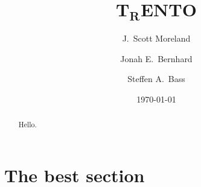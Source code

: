 \documentclass[aps,prl,reprint,amsmath]{revtex4-1}
\begin{document}
\title{T$_{\mathbf R}$ENTO}

\author{J.\ Scott Moreland}
\author{Jonah E.\ Bernhard}
\author{Steffen A.\ Bass}

\date{\today}


\begin{abstract}
  Hello.
\end{abstract}


\maketitle


\section{The best section}


\cite{constraining-ic}



\end{document}
